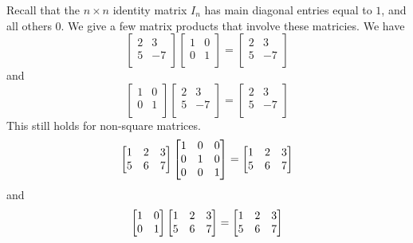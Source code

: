 \documentclass{article}
\begin{document}
\begin{example}
  Recall that the $n \times n$ identity matrix $I_n$ has main diagonal entries equal to $1$, and all others $0$. We give a few matrix products that involve these matricies. We have
  \[
    \begin{bmatrix}
      2 & 3\\
      5 & - 7\\
    \end{bmatrix}
    \begin{bmatrix}
      1 & 0\\
      0 & 1\\
    \end{bmatrix}
    =
    \begin{bmatrix}
      2 & 3\\
      5 & - 7\\
    \end{bmatrix}
  \]
  and \[
    \begin{bmatrix}
      1 & 0\\
      0 & 1\\
    \end{bmatrix}
    \begin{bmatrix}
      2 & 3\\
      5 & - 7\\
    \end{bmatrix}
    =
    \begin{bmatrix}
      2 & 3\\
      5 & - 7\\
    \end{bmatrix}
  \]
  This still holds for non-square matrices.
  \[
    \begin{bmatrix}
      1 & 2 & 3\\
      5 & 6 & 7\\
    \end{bmatrix}
    \mqty[\imat{3}]
    =
    \begin{bmatrix}
      1 & 2 & 3\\
      5 & 6 & 7\\
    \end{bmatrix}
  \] and \[
    \mqty[\imat{2}]
    \begin{bmatrix}
      1 & 2 & 3\\
      5 & 6 & 7\\
    \end{bmatrix} =
    \begin{bmatrix}
      1 & 2 & 3\\
      5 & 6 & 7\\
    \end{bmatrix}
  \]
\end{example}
\end{document}
